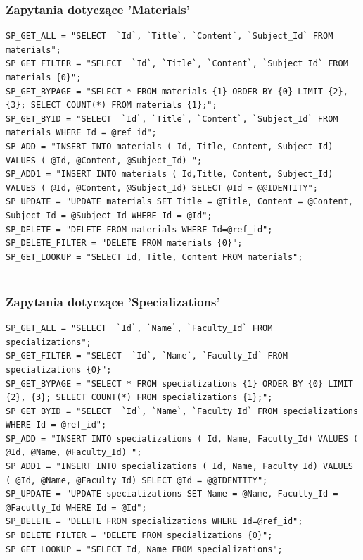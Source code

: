 \documentclass[12pt,a4paper]{article}
\begin{document}
			\subsubsection{Zapytania dotyczące 'Materials'}
			\begin{lstlisting}
SP_GET_ALL = "SELECT  `Id`, `Title`, `Content`, `Subject_Id` FROM materials";
SP_GET_FILTER = "SELECT  `Id`, `Title`, `Content`, `Subject_Id` FROM materials {0}";
SP_GET_BYPAGE = "SELECT * FROM materials {1} ORDER BY {0} LIMIT {2}, {3}; SELECT COUNT(*) FROM materials {1};";
SP_GET_BYID = "SELECT  `Id`, `Title`, `Content`, `Subject_Id` FROM materials WHERE Id = @ref_id";
SP_ADD = "INSERT INTO materials ( Id, Title, Content, Subject_Id) VALUES ( @Id, @Content, @Subject_Id) ";
SP_ADD1 = "INSERT INTO materials ( Id,Title, Content, Subject_Id) VALUES ( @Id, @Content, @Subject_Id) SELECT @Id = @@IDENTITY";
SP_UPDATE = "UPDATE materials SET Title = @Title, Content = @Content, Subject_Id = @Subject_Id WHERE Id = @Id";
SP_DELETE = "DELETE FROM materials WHERE Id=@ref_id";
SP_DELETE_FILTER = "DELETE FROM materials {0}";
SP_GET_LOOKUP = "SELECT Id, Title, Content FROM materials";
			
			\end{lstlisting}
\clearpage	\subsubsection{Zapytania dotyczące 'Specializations'}
			\begin{lstlisting}
SP_GET_ALL = "SELECT  `Id`, `Name`, `Faculty_Id` FROM specializations";
SP_GET_FILTER = "SELECT  `Id`, `Name`, `Faculty_Id` FROM specializations {0}";
SP_GET_BYPAGE = "SELECT * FROM specializations {1} ORDER BY {0} LIMIT {2}, {3}; SELECT COUNT(*) FROM specializations {1};";
SP_GET_BYID = "SELECT  `Id`, `Name`, `Faculty_Id` FROM specializations WHERE Id = @ref_id";
SP_ADD = "INSERT INTO specializations ( Id, Name, Faculty_Id) VALUES ( @Id, @Name, @Faculty_Id) ";
SP_ADD1 = "INSERT INTO specializations ( Id, Name, Faculty_Id) VALUES ( @Id, @Name, @Faculty_Id) SELECT @Id = @@IDENTITY";
SP_UPDATE = "UPDATE specializations SET Name = @Name, Faculty_Id = @Faculty_Id WHERE Id = @Id";
SP_DELETE = "DELETE FROM specializations WHERE Id=@ref_id";
SP_DELETE_FILTER = "DELETE FROM specializations {0}";
SP_GET_LOOKUP = "SELECT Id, Name FROM specializations";
			
			\end{lstlisting}
\end{document}
